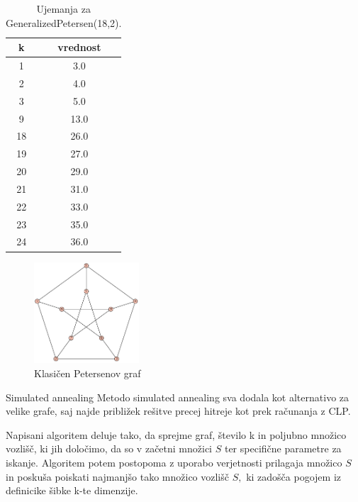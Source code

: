\documentclass[12pt,a4paper]{amsart}
\makeatletter
\renewcommand\section{\@startsection{section}{1}%
  \z@{.5\linespacing\@plus.7\linespacing}{.5\linespacing}%
  {\normalfont\scshape\large\centering}}
\theoremstyle{plain} %
\makeatother
\begin{document}
\begin{table}[h]
    \centering
    \begin{tabular}{|c|c|}
        \hline
        k & vrednost \\
        \hline
        1 & 3.0 \\
        2 & 4.0 \\
        3 & 5.0 \\
        9 & 13.0 \\
        18 & 26.0 \\
        19 & 27.0 \\
        20 & 29.0 \\
        21 & 31.0 \\
        22 & 33.0 \\
        23 & 35.0 \\
        24 & 36.0 \\
        \hline
    \end{tabular}
    \caption{Ujemanja za GeneralizedPetersen(18,2).}
    \label{tab:ujemanja_gp}
\end{table}

\begin{figure}[h]
    \centering
    \includegraphics[width=0.35\textwidth]{slike/petersen.png}
    \caption{Klasičen Petersenov graf}
    \label{fig:slika1}
\end{figure}


\section{Simulated annealing}
Metodo simulated annealing sva dodala kot alternativo za velike grafe, saj najde približek rešitve precej hitreje kot prek računanja z CLP.

Napisani algoritem deluje tako, da sprejme graf, število k in poljubno množico vozlišč, ki jih določimo, da so v začetni množici $S$ ter specifične parametre za iskanje. Algoritem potem postopoma z uporabo verjetnosti prilagaja množico $S$ in poskuša poiskati najmanjšo tako množico vozlišč $S,$ ki zadošča pogojem iz definicike šibke k-te dimenzije.
\end{document}
